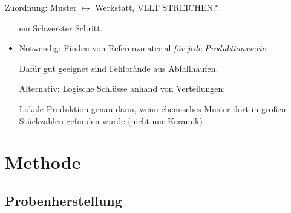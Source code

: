 \documentclass[xcolor=dvipsnames, aspectratio=169]{beamer}
\begin{document}
\begin{frame}{Zuordnung: Muster $\mapsto$ Werkstatt, VLLT STREICHEN?!}
\begin{itemize}
em Schwerster Schritt.
\item Notwendig: Finden von Referenzmaterial \textit{für jede Produktionsserie}.

Dafür gut geeignet sind \alert{Fehlbrände} aus Abfallhaufen.\medskip\pause

Alternativ: Logische Schlüsse anhand von \alert{Verteilungen}:

Lokale Produktion genau dann, wenn chemisches Muster dort in großen Stückzahlen gefunden wurde (nicht nur Keramik)
\end{itemize}
\end{frame}

\section{Methode}

\subsection{Probenherstellung}
\end{document}
